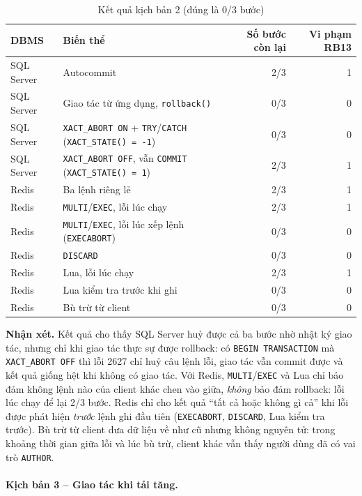 \begin{table}[H]
\centering\small
\begin{tabular}{|l|l|r|r|}
\hline
\textbf{DBMS} & \textbf{Biến thể} & \textbf{Số bước còn lại} & \textbf{Vi phạm RB13} \\ \hline
SQL Server & Autocommit & 2/3 & 1 \\ \hline
SQL Server & Giao tác từ ứng dụng, \texttt{rollback()} & 0/3 & 0 \\ \hline
SQL Server & \texttt{XACT\_ABORT ON} + \texttt{TRY}/\texttt{CATCH} (\texttt{XACT\_STATE() = -1}) & 0/3 & 0 \\ \hline
SQL Server & \texttt{XACT\_ABORT OFF}, vẫn \texttt{COMMIT} (\texttt{XACT\_STATE() = 1}) & 2/3 & 1 \\ \hline
Redis & Ba lệnh riêng lẻ & 2/3 & 1 \\ \hline
Redis & \texttt{MULTI}/\texttt{EXEC}, lỗi lúc chạy & 2/3 & 1 \\ \hline
Redis & \texttt{MULTI}/\texttt{EXEC}, lỗi lúc xếp lệnh (\texttt{EXECABORT}) & 0/3 & 0 \\ \hline
Redis & \texttt{DISCARD} & 0/3 & 0 \\ \hline
Redis & Lua, lỗi lúc chạy & 2/3 & 1 \\ \hline
Redis & Lua kiểm tra trước khi ghi & 0/3 & 0 \\ \hline
Redis & Bù trừ từ client & 0/3 & 0 \\ \hline
\end{tabular}
\caption{Kết quả kịch bản 2 (đúng là 0/3 bước)}
\label{tab:tx-t2}
\end{table}

\textbf{Nhận xét.} Kết quả cho thấy SQL Server huỷ được cả ba bước nhờ nhật ký giao tác, nhưng chỉ khi giao tác thực sự được rollback: có \texttt{BEGIN TRANSACTION} mà \texttt{XACT\_ABORT OFF} thì lỗi 2627 chỉ huỷ câu lệnh lỗi, giao tác vẫn commit được và kết quả giống hệt khi không có giao tác. Với Redis, \texttt{MULTI}/\texttt{EXEC} và Lua chỉ bảo đảm không lệnh nào của client khác chen vào giữa, \emph{không} bảo đảm rollback: lỗi lúc chạy để lại 2/3 bước. Redis chỉ cho kết quả ``tất cả hoặc không gì cả'' khi lỗi được phát hiện \emph{trước} lệnh ghi đầu tiên (\texttt{EXECABORT}, \texttt{DISCARD}, Lua kiểm tra trước). Bù trừ từ client đưa dữ liệu về như cũ nhưng không nguyên tử: trong khoảng thời gian giữa lỗi và lúc bù trừ, client khác vẫn thấy người dùng đã có vai trò \texttt{AUTHOR}.

\paragraph{Kịch bản 3 -- Giao tác khi tải tăng.}

